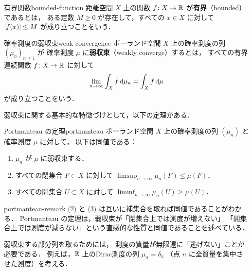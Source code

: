 \begin{definition}{有界関数}{bounded-function}
  距離空間 $X$ 上の関数 $f \colon X \to \mathbb{R}$ が\textbf{有界}（bounded）であるとは，
  ある定数 $M \geq 0$ が存在して，すべての $x \in X$ に対して $\lvert f(x) \rvert \leq M$
  が成り立つことをいう．
\end{definition}

\begin{definition}{確率測度の弱収束}{weak-convergence}
  ポーランド空間 $X$ 上の確率測度の列 $(\mu_n)_{n \geq 1}$ が
  確率測度 $\mu$ に\textbf{弱収束}（weakly converge）するとは，
  すべての有界連続関数 $f \colon X \to \mathbb{R}$ に対して
  \[
    \lim_{n \to \infty} \int_X f \, \mathrm{d}\mu_n = \int_X f \, \mathrm{d}\mu
  \]
  が成り立つことをいう．
\end{definition}

弱収束に関する基本的な特徴づけとして，以下の定理がある．

\begin{theorem}{Portmanteau の定理}{portmanteau}
  ポーランド空間 $X$ 上の確率測度の列 $(\mu_n)$ と確率測度 $\mu$ に対して，
  以下は同値である：
  \begin{enumerate}
    \item $\mu_n$ が $\mu$ に弱収束する．
    \item すべての閉集合 $F \subset X$ に対して
      $\limsup_{n \to \infty} \mu_n(F) \leq \mu(F)$．
    \item すべての開集合 $U \subset X$ に対して
      $\liminf_{n \to \infty} \mu_n(U) \geq \mu(U)$．
  \end{enumerate}
\end{theorem}

\begin{remark}{}{portmanteau-remark}
  (2) と (3) は互いに補集合を取れば同値であることがわかる．
  Portmanteau の定理は，弱収束が「閉集合上では測度が増えない」
  「開集合上では測度が減らない」という直感的な性質と同値であることを述べている．
\end{remark}

弱収束する部分列を取るためには，
測度の質量が無限遠に「逃げない」ことが必要である．
例えば，$\mathbb{R}$ 上のDirac測度の列 $\mu_n = \delta_n$
（点 $n$ に全質量を集中させた測度）を考える．

